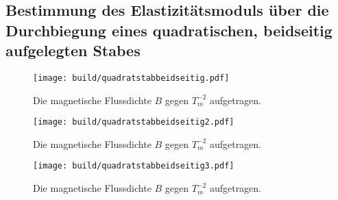\subsection{Bestimmung des Elastizitätsmoduls über die Durchbiegung eines quadratischen, beidseitig aufgelegten Stabes}
\begin{figure}
	\centering
	\caption{Die magnetische Flussdichte $B$ gegen $T_m ^{-2}$ aufgetragen.}
	\texttt{[image: build/quadratstabbeidseitig.pdf]}
	\label{fig:grad3}
\end{figure}
\begin{figure}
	\centering
	\caption{Die magnetische Flussdichte $B$ gegen $T_m ^{-2}$ aufgetragen.}
	\texttt{[image: build/quadratstabbeidseitig2.pdf]}
	\label{fig:grad3}
\end{figure}
\begin{figure}
	\centering
	\caption{Die magnetische Flussdichte $B$ gegen $T_m ^{-2}$ aufgetragen.}
	\texttt{[image: build/quadratstabbeidseitig3.pdf]}
	\label{fig:grad3}
\end{figure}

